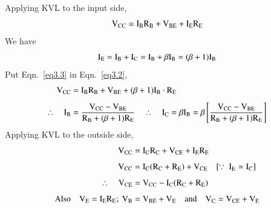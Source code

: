 Applying KVL to the input side,
\begin{equation}
\textrm{V}_{\text{CC}} = \textrm{I}_{\textrm{B}}\textrm{R}_{\textrm{B}}+\textrm{V}_{\text{BE}}+\textrm{I}_{\textrm{E}}\textrm{R}_{\textrm{E}}\label{eq3.2}
\end{equation}
We have
\begin{equation}
\textrm{I}_{\textrm{E}}=\textrm{I}_{\textrm{B}}+\textrm{I}_{\textrm{C}}=\textrm{I}_{\textrm{B}}+\beta \textrm{I}_{\textrm{B}}=(\beta+1)\textrm{I}_{\textrm{B}}\label{eq3.3}
\end{equation}
Put Eqn.~\eqref{eq3.3} in Eqn.~\eqref{eq3.2}, 
\begin{align*}
\textrm{V}_{\text{CC}} &= \textrm{I}_{\textrm{B}}\textrm{R}_{\textrm{B}}+\textrm{V}_{\text{BE}}+(\beta+1)\textrm{I}_{\textrm{B}}\cdot \textrm{R}_{\textrm{E}}\\[4pt]
\therefore\quad \textrm{I}_{\textrm{B}} &= \frac{\textrm{V}_{\text{CC}}-\textrm{V}_{\text{BE}}}{\textrm{R}_{\textrm{B}}+(\beta+1)\textrm{R}_{\textrm{E}}}\quad\therefore\quad \textrm{I}_{\textrm{C}}=\beta \textrm{I}_{\textrm{B}}=\beta \left[\frac{\textrm{V}_{\text{CC}}-\textrm{V}_{\text{BE}}}{\textrm{R}_{\textrm{B}}+(\beta+1)\textrm{R}_{\textrm{E}}}\right]
\end{align*}
Applying KVL to the outside side,
\begin{align*}
\rmV_{\text{CC}} &= \rmI_{\rmC}\rmR_{\rmC}+\rmV_{\text{CE}}+\rmI_{\rmE}\rmR_{\rmE}\\[4pt]
\rmV_{\text{CC}} &= \rmI_{\rmC}(\rmR_{\rmC}+\rmR_{\rmE})+\rmV_{\text{CE}}\quad [\because \ \rmI_{\rmE}\simeq \rmI_{\rmC}]\\[4pt]
\therefore\quad \rmV_{\text{CE}} &= \rmV_{\text{CC}}-\rmI_{\rmC}(\rmR_{\rmC}+\rmR_{\rmE})\\[4pt]
\text{Also}\quad  \rmV_{\rmE}=\rmI_{\rmE}\rmR_{\rmE}; \ \rmV_{\rmB} &= \rmV_{\text{BE}}+\rmV_{\rmE}\quad\text{and}\quad \rmV_{\rmC}=\rmV_{\text{CE}}+\rmV_{\rmE}
\end{align*}

\eject

